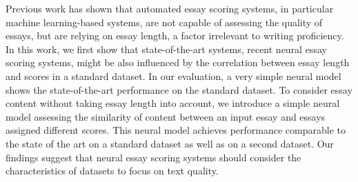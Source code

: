 Previous work has shown that automated essay scoring systems, in particular machine learning-based systems, are not capable of assessing the quality of essays, but are relying on essay length, a factor irrelevant to writing proficiency. In this work, we first show that state-of-the-art systems, recent neural essay scoring systems, might be also influenced by the correlation between essay length and scores in a standard dataset. In our evaluation, a very simple neural model shows the state-of-the-art performance on the standard dataset. To consider essay content without taking essay length into account, we introduce a simple neural model assessing the similarity of content between an input essay and essays assigned different scores. This neural model achieves performance comparable to the state of the art on a standard dataset as well as on a second dataset. Our findings suggest that neural essay scoring systems should consider the characteristics of datasets to focus on text quality.
